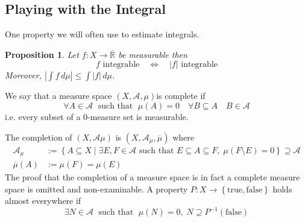 \documentclass[11pt]{article}
\newcommand{\defeq}{:=}
\newcommand{\abs}[1]{|#1|}
\newcommand{\msrspc}{\ensuremath{(X,\mathcal{A},\mu)}}
\newcommand{\relmiddle}[1]{\mathrel{}\middle#1\mathrel{}}
\newcommand{\rmv}{\relmiddle|}
\newcommand{\dm}{\ensuremath{\,d\mu}}
\newcommand{\R}{\mathbb{R}}
\newcommand{\Rb}{\overline{\R}}
\newenvironment{defin}
	{\begin{mdframed}[backgroundcolor=white, roundcorner=5pt, linewidth=1pt]}
	{\end{mdframed}}
\newcommand{\mdf}[1]{{\color{red} #1}}
\newtheorem{prop}[theorem]{Proposition}
\begin{document}
\subsection{Playing with the Integral}
One property we will often use to estimate integrals.
\begin{prop}
Let $f:X\to\Rb$ be measurable then
\[
	f\text{ integrable}\quad\iff\quad\abs{f}\text{ integrable}
\]
Moreover, $\abs{\int f \dm} \leq \int \abs{f} \dm$.
\end{prop}
\begin{defin}
	We say that a measure space \msrspc is \mdf{complete} if 
\[
	\forall A \in \mathcal{A}\;\text{ such that }\;\mu(A) = 0\quad \forall B\subseteq A\quad B\in\mathcal{A}
\]
i.e. every subset of a $0$-measure set is measurable.

The \mdf{completion} of $(X, \mathcal{A}\mu)$ is $(X, \mathcal{A}_\mu , \overline{\mu})$ where
\begin{align*}
	\mathcal{A}_\mu & \defeq \left\{A \subseteq X \rmv \exists E,F\in\mathcal{A}\text{ such that }E\subseteq A \subseteq F,\;\mu(F\setminus E)=0\right\}\supseteq \mathcal{A}\\
	\overline{\mu}(A) & \defeq \mu(F) = \mu(E)
\end{align*}
The proof that the completion of a measure space is in fact a complete measure space is omitted and non-examinable.
	A property $P:X\to\left\{\text{true}, \text{false}\right\}$ holds \mdf{almost everywhere} if 
	\[
		\exists N\in \mathcal{A}\;\text{ such that }\;\mu(N)=0,\;N\supseteq P^{-1}(\text{false})
	\]
\end{defin}
\end{document}
